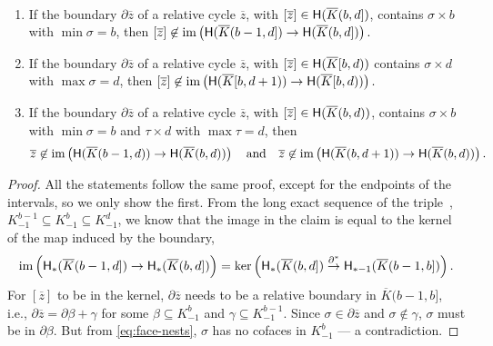 \documentclass[cleveref,a4paper,english,nolineno]{socg-lipics-v2021}
\newcommand{\im}{\operatorname{im}}
\newcommand{\Hgr}{{\sf H}}
\newcommand{\prism}[1]{\overline{#1}}
\newcommand{\bdry}{\partial}
\newcommand{\pK}{\prism{K}}
\newcommand{\pz}{\prism{z}}
\newcommand{\subK}[1]{K_{-1}^{#1}}
\newcommand{\ssx}{\sigma}
\newcommand{\tsx}{\tau}
\begin{document}
\begin{lemma}~
    \label{clm:open-endpoint}
    \begin{enumerate}
        \item
            If the boundary $\bdry \pz$ of a relative cycle $\pz$, with $[\pz] \in \Hgr(\pK(b,d])$,
            contains $\ssx \times b$ with $\min \ssx = b$, then
            $
                [\pz] \not\in \im \left( \Hgr(\pK(b-1,d]) \to \Hgr(\pK(b,d]) \right).
            $
        \item
            If the boundary $\bdry \pz$ of a relative cycle $\pz$, with $[\pz] \in \Hgr(\pK[b,d))$
            contains $\ssx \times d$ with $\max \ssx = d$, then
            $
                [\pz] \not\in \im \left( \Hgr(\pK[b,d+1)) \to \Hgr(\pK[b,d)) \right).
            $
        \item
            If the boundary $\bdry \pz$ of a relative cycle $\pz$, with $[\pz] \in \Hgr(\pK(b,d))$,
            contains $\ssx \times b$ with $\min \ssx = b$ and $\tsx \times d$ with $\max \tsx = d$, then
            \[
                \pz \not\in \im \left( \Hgr(\pK(b-1,d)) \to \Hgr(\pK(b,d)) \right)
                \quad \text{and} \quad
                \pz \not\in \im \left( \Hgr(\pK(b,d+1)) \to \Hgr(\pK(b,d)) \right).
            \]
    \end{enumerate}
\end{lemma}
\begin{proof}
    All the statements follow the same proof, except for the endpoints of the
    intervals, so we only show the first.
    From the long exact sequence of the triple~\cite[p.~118]{Hat02}, $\subK{b-1} \subseteq \subK{b} \subseteq \subK{d}$,
    we know that the image in the claim is equal to the kernel of the map
    induced by the boundary,
    \[
        \im \left( \Hgr_*(\pK(b-1,d]) \stackrel{\phantom{i^*}}{\to} \Hgr_*(\pK(b,d]) \right)
            =
        \ker \left( \Hgr_*(\pK(b,d]) \stackrel{\bdry^*}{\to} \Hgr_{*-1}(\pK(b-1,b]) \right).
    \]
    For $[\pz]$ to be in the kernel, $\bdry \pz$ needs to be a relative boundary in
    $\pK(b-1,b]$, i.e., $\bdry \pz = \bdry \beta + \gamma$ for some $\beta
    \subseteq \subK{b}$ and $\gamma \subseteq \subK{b-1}$.
    Since $\ssx \in \bdry \pz$ and $\ssx \not\in \gamma$, $\ssx$ must be in $\bdry \beta$.
    But from \cref{eq:face-nests}, $\ssx$ has no cofaces in $\subK{b}$ --- a contradiction.
\end{proof}
\end{document}
